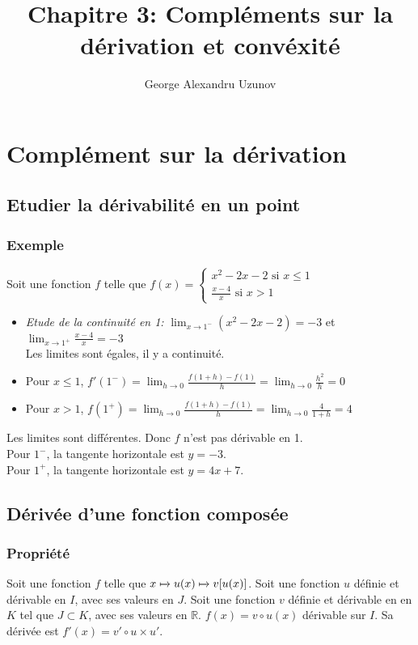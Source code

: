 \documentclass[9pt,twoside]{article}
\title{Chapitre 3: Compléments sur la dérivation et convéxité}
\author{George Alexandru Uzunov}
\date{}
\begin{document}
\maketitle
\tableofcontents\newpage


\section{Complément sur la dérivation}
\subsection{Etudier la dérivabilité en un point}
\subsubsection*{Exemple}
Soit une fonction $f$ telle que $f(x) = \begin{cases}x^2-2x-2 \text{ si } x\leq 1 \\
\frac{x-4}{x} \text{ si } x>1 \end{cases}$
\begin{itemize}[label=\textbullet]
	\item \textit{Etude de la continuité en 1:} $\lim_{x \to 1^{-}}(x^2-2x-2)=-3$ et $\lim_{x\to 1^{+}}\frac{x-4}{x}=-3$ \\ Les limites sont égales, il y a continuité.
	\item Pour $x\leq 1$, $f'(1^{-})=\lim_{h\to 0}\frac{f(1+h)-f(1)}{h}=\lim_{h\to 0}\frac{h^2}{h}=0$
	\item Pour $x>1$, $f(1^{+})=\lim_{h\to 0}\frac{f(1+h)-f(1)}{h}=\lim_{h\to 0}\frac{4}{1+h}=4$
\end{itemize}
Les limites sont différentes. Donc $f$ n'est pas dérivable en 1.\\ Pour $1^{-}$, la tangente horizontale est $y=-3$. \\ Pour $1^{+}$, la tangente horizontale est $y=4x+7$.

\subsection{Dérivée d'une fonction composée}
\subsubsection*{Propriété}
Soit une fonction $f$ telle que $x \xmapsto{} u(x) \xmapsto{} v[u(x)]$. Soit une fonction $u$ définie et dérivable en $I$, avec ses valeurs en $J$. Soit une fonction $v$ définie et dérivable en en $K$ tel que $J \subset K$, avec ses valeurs en $\mathbb{R}$. $f(x) = v\circ u(x)$ dérivable sur $I$. Sa dérivée est $f'(x) = v'\circ u \times u'$. 
\end{document}
